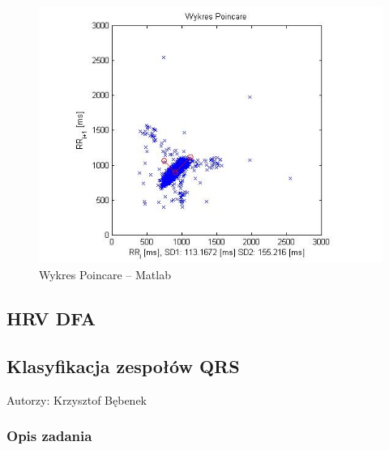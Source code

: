 \documentclass[a4paper, 11pt]{article}
\begin{document}
\begin{center}
%
\begin{figure}
\begin{centering}
\includegraphics[scale=0.7]{include/hrv2_3}
\par\end{centering}

\caption{Wykres Poincare -- Matlab}
\label{fig:hrv2_3}
\end{figure}

\par\end{center}

\subsection{HRV DFA}
\label{sec:hrvd_fa}

\subsection{Klasyfikacja zespołów QRS}
\label{sec:qrs_class}
Autorzy: Krzysztof Bębenek

\subsubsection{Opis zadania}
\label{sec:qrs_class:desc}
\end{document}
